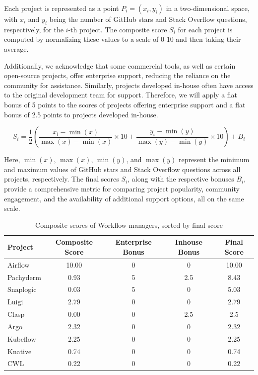 Each project is represented as a point \(P_i = (x_i, y_i)\) in a two-dimensional space, with \(x_i\) and \(y_i\) being the number of GitHub stars and Stack Overflow questions, respectively, for the \(i\)-th project. The composite score \(S_i\) for each project is computed by normalizing these values to a scale of 0-10 and then taking their average.

Additionally, we acknowledge that some commercial tools, as well as certain open-source projects, offer enterprise support, reducing the reliance on the community for assistance. Similarly, projects developed in-house often have access to the original development team for support. Therefore, we will apply a flat bonus of 5 points to the scores of projects offering enterprise support and a flat bonus of 2.5 points to projects developed in-house.

\[
S_i = \frac{1}{2} \left( \frac{x_i - \min(x)}{\max(x) - \min(x)} \times 10 + \frac{y_i - \min(y)}{\max(y) - \min(y)} \times 10 \right) + B_i
\]

Here, \(\min(x)\), \(\max(x)\), \(\min(y)\), and \(\max(y)\) represent the minimum and maximum values of GitHub stars and Stack Overflow questions across all projects, respectively. The final scores \(S_i\), along with the respective bonuses \(B_i\), provide a comprehensive metric for comparing project popularity, community engagement, and the availability of additional support options, all on the same scale.

\begin{table}[h!]
    \centering
    \begin{tabular}{|l|c|c|c|c|} 
    \hline
        \textbf{Project} & \textbf{Composite Score} & \textbf{Enterprise Bonus} & \textbf{Inhouse Bonus}  & \textbf{Final Score}\\
        \hline
        Airflow & 10.00 & 0 & 0 & 10.00 \\
        Pachyderm & 0.93 & 5 & 2.5 & 8.43 \\
        Snaplogic & 0.03 & 5 & 0 & 5.03 \\
        Luigi & 2.79 & 0 & 0 & 2.79 \\
        Clasp & 0.00 & 0 & 2.5 & 2.5 \\
        Argo & 2.32 & 0 & 0 & 2.32 \\
        Kubeflow & 2.25 & 0 & 0 & 2.25 \\
        Knative & 0.74 & 0 & 0 & 0.74 \\
        CWL & 0.22 & 0 & 0 & 0.22 \\
    \hline
    \end{tabular}
    \caption{Composite scores of Workflow managers, sorted by final score}
    \label{tab:results}
\end{table}

